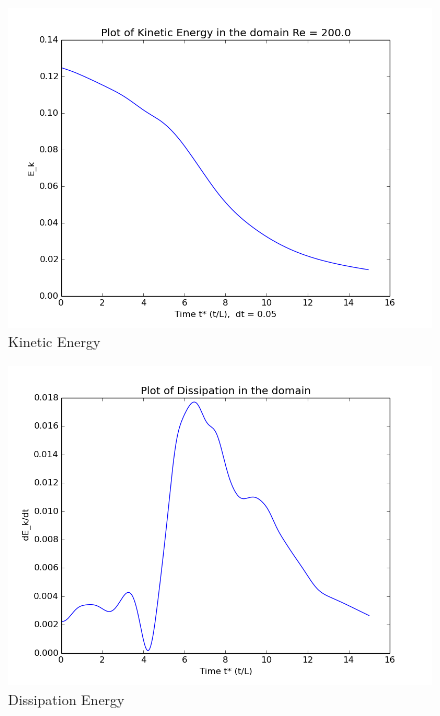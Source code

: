 \documentclass[a4paper,norsk]{article}
\begin{document}
\begin{figure}[h!]
	\centering
	\caption*{Kinetic Energy}
	\includegraphics[scale=0.6]{3D/Et.png}
\end{figure}

\begin{figure}[h!]
	\centering
	\caption*{Dissipation Energy}
	\includegraphics[scale=0.6]{3D/dissi.png}
\end{figure}
\end{document}
